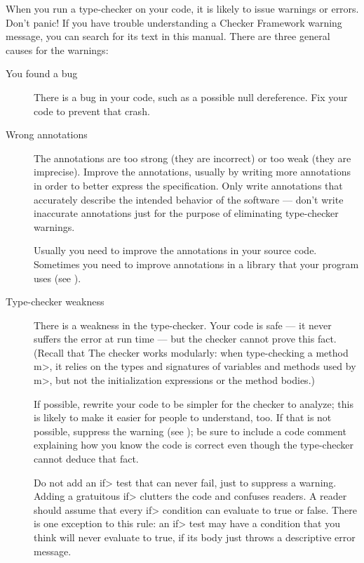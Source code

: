 When you run a type-checker on your code, it is likely to issue warnings or
errors.  Don't panic!
If you have trouble understanding a Checker Framework warning message, you
can search for its text in this manual.
There are three general causes for the warnings:

\begin{description}
\item[You found a bug]
  There is a bug in your code, such as a possible null dereference.  Fix
  your code to prevent that crash.

\item[Wrong annotations]
  The annotations are too strong (they are incorrect) or too weak (they
  are imprecise).  Improve the
  annotations, usually by writing more annotations in order to better
  express the specification.
  Only write annotations that accurately describe the intended behavior of
  the software --- don't write inaccurate annotations just for the purpose
  of eliminating type-checker warnings.

  Usually you need to improve the annotations in your source code.
  Sometimes you need to improve annotations in a library that your program
  uses (see ).

\item[Type-checker weakness]
  There is a weakness in the type-checker.  Your code is safe --- it never
  suffers the error at run time --- but the checker cannot prove this fact.
  (Recall that The checker works modularly:  when type-checking a
  method \<m>, it relies on the types and signatures of variables and
  methods used by \<m>, but not the initialization expressions or the
  method bodies.)

  If possible, rewrite your code to be simpler for the checker to analyze;
  this is likely to make it easier for people to understand, too.
  If that is not possible, suppress the warning (see
  ); be sure to include a code
  comment explaining how you know the code is correct even though the
  type-checker cannot deduce that fact.

  Do not add an \<if> test that can never fail, just to suppress a
  warning.  Adding a gratuitous \<if> clutters the code and confuses
  readers.  A reader should assume that every \<if> condition can evaluate to true
  or false.  There is one exception to this rule:  an \<if> test may have a
  condition that you think will never evaluate to true, if its body just throws a
  descriptive error message.
\end{description}

